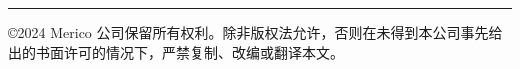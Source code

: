 \noindent \rule{\textwidth}{1pt}

©2024 Merico 公司保留所有权利。除非版权法允许，否则在未得到本公司事先给出的书面许可的情况下，严禁复制、改编或翻译本文。
